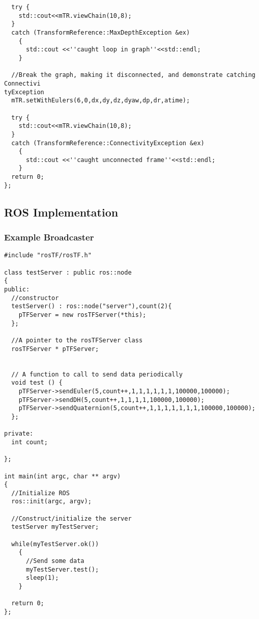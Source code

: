 \documentclass[12pt]{article}
\begin{document}
\begin{verbatim}
  try {
    std::cout<<mTR.viewChain(10,8);
  }
  catch (TransformReference::MaxDepthException &ex)
    {
      std::cout <<''caught loop in graph''<<std::endl;
    }
  
  //Break the graph, making it disconnected, and demonstrate catching Connectivi
tyException
  mTR.setWithEulers(6,0,dx,dy,dz,dyaw,dp,dr,atime);

  try {
    std::cout<<mTR.viewChain(10,8);
  }
  catch (TransformReference::ConnectivityException &ex)
    {
      std::cout <<''caught unconnected frame''<<std::endl;
    }  
  return 0;
};

\end{verbatim}

\subsection{ROS Implementation}

\subsubsection{Example Broadcaster}
\begin{verbatim}
#include "rosTF/rosTF.h"

class testServer : public ros::node
{
public:
  //constructor
  testServer() : ros::node("server"),count(2){
    pTFServer = new rosTFServer(*this);
  };

  //A pointer to the rosTFServer class
  rosTFServer * pTFServer;


  // A function to call to send data periodically
  void test () {
    pTFServer->sendEuler(5,count++,1,1,1,1,1,1,100000,100000);
    pTFServer->sendDH(5,count++,1,1,1,1,100000,100000);
    pTFServer->sendQuaternion(5,count++,1,1,1,1,1,1,1,100000,100000);
  };

private:
  int count;

};

int main(int argc, char ** argv)
{
  //Initialize ROS
  ros::init(argc, argv);

  //Construct/initialize the server
  testServer myTestServer;
  
  while(myTestServer.ok())
    {
      //Send some data
      myTestServer.test();
      sleep(1);
    }

  return 0;
};
\end{verbatim}
\end{document}
